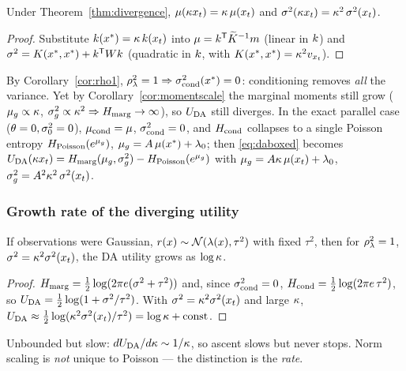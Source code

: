 \begin{corollary}\label{cor:momentscale}
Under Theorem~\ref{thm:divergence}, $\mu(\kappa x_t)=\kappa\,\mu(x_t)$ and
$\sigma^{2}(\kappa x_t)=\kappa^2\,\sigma^{2}(x_t)$.
\end{corollary}
\begin{proof}
Substitute $k(x^*)=\kappa\,k(x_t)$ into $\mu=k^{\mathsf{T}}\widetilde{K}^{-1}m$
(linear in $k$) and $\sigma^{2}=K(x^*,x^*)+k^{\mathsf{T}} Wk$ (quadratic in
$k$, with $K(x^*,x^*)=\kappa^2v_{x_t}$).
\end{proof}

By Corollary~\ref{cor:rho1}, $\rho_{\lambda}^2=1\Rightarrow\sigma^{2}_{\mathrm{cond}}(x^*)=0$:
conditioning removes \emph{all} the variance. Yet by
Corollary~\ref{cor:momentscale} the marginal moments still grow
($\mu_{g}\propto\kappa$, $\sigma_{g}^{2}\propto\kappa^2\Rightarrow H_{\mathrm{marg}}\to\infty$), so $U_{\mathrm{DA}}$
still diverges. In the exact parallel case ($\theta=0,\sigma_{0}^2=0$),
$\mu_{\mathrm{cond}}=\mu$, $\sigma^{2}_{\mathrm{cond}}=0$, and $H_{\mathrm{cond}}$ collapses
to a single Poisson entropy $H_{\mathrm{Poisson}}(e^{\mu_{g}})$, $\mu_{g}=A\,\mu(x^*)+\lambda_{0}$;
then \eqref{eq:daboxed} becomes
$U_{\mathrm{DA}}(\kappa x_t)=H_{\mathrm{marg}}(\mu_{g},\sigma_{g}^{2})-H_{\mathrm{Poisson}}(e^{\mu_{g}})$ with
$\mu_{g}=A\kappa\,\mu(x_t)+\lambda_{0}$, $\sigma_{g}^{2}=A^2\kappa^2\,\sigma^{2}(x_t)$.

\subsubsection{Growth rate of the diverging utility}
\begin{proposition}\label{prop:gauss-logc}
If observations were Gaussian, $r(x)\sim\mathcal{N}(\lambda(x),\tau^2)$ with fixed $\tau^2$,
then for $\rho_{\lambda}^2=1$, $\sigma^{2}=\kappa^2\sigma^{2}(x_t)$, the DA utility grows as $\log\kappa$.
\end{proposition}
\begin{proof}
$H_{\mathrm{marg}}=\tfrac12\log(2\pi e(\sigma^{2}+\tau^2))$ and, since $\sigma^{2}_{\mathrm{cond}}=0$,
$H_{\mathrm{cond}}=\tfrac12\log(2\pi e\,\tau^2)$, so
$U_{\mathrm{DA}}=\tfrac12\log(1+\sigma^{2}/\tau^2)$. With $\sigma^{2}=\kappa^2\sigma^{2}(x_t)$ and large
$\kappa$, $U_{\mathrm{DA}}\approx\tfrac12\log(\kappa^2\sigma^{2}(x_t)/\tau^2)=\log\kappa+\text{const}$.
\end{proof}
Unbounded but slow: $dU_{\mathrm{DA}}/d\kappa\sim1/\kappa$, so ascent slows but never stops.
Norm scaling is \emph{not} unique to Poisson --- the distinction is the \emph{rate}.

